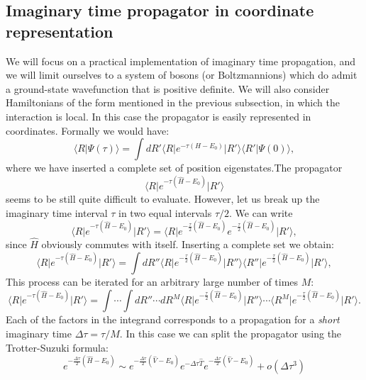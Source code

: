 \subsection{Imaginary time propagator in coordinate representation}
\label{sec:dmccoord}
We will focus on a practical implementation of imaginary time propagation, and we will limit ourselves to a system of bosons (or Boltzmannions) which do admit a ground-state wavefunction that is positive definite. We will also consider Hamiltonians of the form mentioned in the previous subsection, in which the interaction is local.
In this case the propagator is easily represented in coordinates. Formally we would have:
\begin{equation}
\langle R \vert\Psi(\tau)\rangle=\int dR' \langle R\vert e^{-\tau(H-E_0)}\vert R'\rangle\langle R'\vert\Psi(0)\rangle,\label{general_diff}
\end{equation}
where we have inserted a complete set of position eigenstates.The propagator
\begin{equation}
\langle R \vert e^{-\tau(\hat{H}-E_0)}\vert R'\rangle
\end{equation}
seems to be still quite difficult to evaluate. However, let us break up the imaginary time interval
$\tau$ in two equal intervals $\tau/2$. We can write
\begin{equation}
\langle R \vert e^{-\tau(\hat{H}-E_0)}\vert R'\rangle=\langle R \vert e^{-\frac{\tau}{2}(\hat{H}-E_0)}e^{-\frac{\tau}{2}(\hat{H}-E_0)}\vert R'\rangle,
\end{equation}
since $\hat{H}$ obviously commutes with itself. Inserting a complete set we obtain:
 \begin{equation}
\langle R \vert e^{-\tau(\hat{H}-E_0)}\vert R'\rangle=\int dR''\langle R \vert e^{-\frac{\tau}{2}(\hat{H}-E_0)}\vert R''\rangle\langle R''\vert e^{-\frac{\tau}{2}(\hat{H}-E_0)}\vert R'\rangle,
\end{equation}
This process can be iterated for an arbitrary large number of times $M$:
\begin{equation}
\langle R \vert e^{-\tau(\hat{H}-E_0)}\vert R'\rangle=\int\cdots\int dR''\cdots dR^M\langle R \vert e^{-\frac{\tau}{2}(\hat{H}-E_0)}\vert R''\rangle\cdots\langle R^M\vert e^{-\frac{\tau}{2}(\hat{H}-E_0)}\vert R'\rangle.\label{path}
\end{equation}
Each of the factors in the integrand corresponds to a propagation for a {\it short} imaginary time $\Delta\tau=\tau/M$.
In this case we can split the propagator using the Trotter-Suzuki formula:
\begin{equation}
e^{-\frac{\Delta\tau}{2}(\hat{H}-E_0)}\sim e^{-\frac{\Delta\tau}{2}(\hat{V}-E_0)}e^{-\Delta\tau\hat{T}}e^{-\frac{\Delta\tau}{2}(\hat{V}-E_0)}+o(\Delta\tau^3)
\end{equation}
